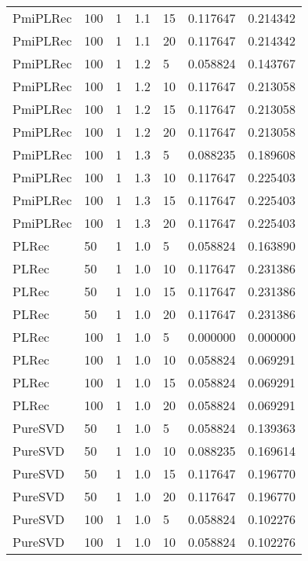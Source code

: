 \begin{tabular}{lllrlrr}
  PmiPLRec &  100 &     1 &   1.1 &   15 &     0.117647 &  0.214342 \\
  PmiPLRec &  100 &     1 &   1.1 &   20 &     0.117647 &  0.214342 \\
  PmiPLRec &  100 &     1 &   1.2 &    5 &     0.058824 &  0.143767 \\
  PmiPLRec &  100 &     1 &   1.2 &   10 &     0.117647 &  0.213058 \\
  PmiPLRec &  100 &     1 &   1.2 &   15 &     0.117647 &  0.213058 \\
  PmiPLRec &  100 &     1 &   1.2 &   20 &     0.117647 &  0.213058 \\
  PmiPLRec &  100 &     1 &   1.3 &    5 &     0.088235 &  0.189608 \\
  PmiPLRec &  100 &     1 &   1.3 &   10 &     0.117647 &  0.225403 \\
  PmiPLRec &  100 &     1 &   1.3 &   15 &     0.117647 &  0.225403 \\
  PmiPLRec &  100 &     1 &   1.3 &   20 &     0.117647 &  0.225403 \\
     PLRec &   50 &     1 &   1.0 &    5 &     0.058824 &  0.163890 \\
     PLRec &   50 &     1 &   1.0 &   10 &     0.117647 &  0.231386 \\
     PLRec &   50 &     1 &   1.0 &   15 &     0.117647 &  0.231386 \\
     PLRec &   50 &     1 &   1.0 &   20 &     0.117647 &  0.231386 \\
     PLRec &  100 &     1 &   1.0 &    5 &     0.000000 &  0.000000 \\
     PLRec &  100 &     1 &   1.0 &   10 &     0.058824 &  0.069291 \\
     PLRec &  100 &     1 &   1.0 &   15 &     0.058824 &  0.069291 \\
     PLRec &  100 &     1 &   1.0 &   20 &     0.058824 &  0.069291 \\
   PureSVD &   50 &     1 &   1.0 &    5 &     0.058824 &  0.139363 \\
   PureSVD &   50 &     1 &   1.0 &   10 &     0.088235 &  0.169614 \\
   PureSVD &   50 &     1 &   1.0 &   15 &     0.117647 &  0.196770 \\
   PureSVD &   50 &     1 &   1.0 &   20 &     0.117647 &  0.196770 \\
   PureSVD &  100 &     1 &   1.0 &    5 &     0.058824 &  0.102276 \\
   PureSVD &  100 &     1 &   1.0 &   10 &     0.058824 &  0.102276 \\

\end{tabular}
